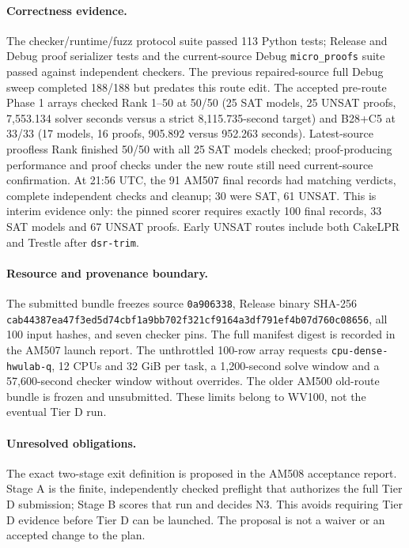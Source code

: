 \documentclass[11pt]{article}
\begin{document}
\paragraph{Correctness evidence.}
The checker/runtime/fuzz protocol suite passed 113 Python tests; Release and
Debug proof serializer tests and the current-source Debug \texttt{micro\_proofs}
suite passed against independent checkers. The previous repaired-source full
Debug sweep completed 188/188 but predates this route edit. The accepted
pre-route Phase 1 arrays checked Rank 1--50 at 50/50 (25 SAT models, 25 UNSAT
proofs, 7,553.134 solver seconds versus a strict 8,115.735-second target) and
B28+C5 at 33/33 (17 models, 16 proofs, 905.892 versus 952.263 seconds).
Latest-source proofless Rank finished 50/50 with all 25 SAT models checked;
proof-producing performance and proof checks under the new route still need
current-source confirmation. At 21:56 UTC, the 91 AM507 final records had
matching verdicts, complete independent checks and cleanup; 30 were SAT, 61
UNSAT. This is interim evidence only: the pinned scorer requires exactly 100
final records, 33 SAT models and 67 UNSAT proofs. Early UNSAT routes include
both CakeLPR and Trestle after \texttt{dsr-trim}.

\paragraph{Resource and provenance boundary.}
The submitted bundle freezes source \texttt{0a906338}, Release binary SHA-256
\texttt{cab44387ea47f3ed5d74cbf1a9bb702f321cf9164a3df791ef4b07d760c08656},
all 100 input hashes, and seven checker pins. The full manifest digest is
recorded in the AM507 launch report. The unthrottled 100-row array requests
\texttt{cpu-dense-hwulab-q},
12 CPUs and 32 GiB per task, a 1,200-second solve window and a 57,600-second
checker window without overrides. The older AM500 old-route bundle is frozen
and unsubmitted. These limits belong to WV100, not the eventual Tier D run.

\paragraph{Unresolved obligations.}
The exact two-stage exit definition is proposed in the AM508 acceptance
report. Stage A is the finite, independently checked preflight that authorizes
the full Tier D submission; Stage B scores that run and decides N3. This avoids
requiring Tier D evidence before Tier D can be launched. The proposal is not a
waiver or an accepted change to the plan.
\end{document}
